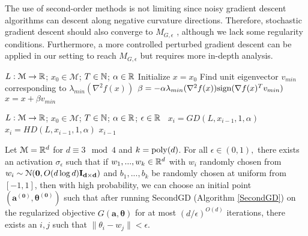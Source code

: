The use of second-order methods is not limiting since noisy gradient descent algorithms can descent along negative curvature directions. Therefore, stochastic gradient descent should also converge to $M_{G,\epsilon}$ \cite{GeHJY15}, although we lack some regularity conditions. Furthermore, a more controlled perturbed gradient descent \cite{jin2017escape} can be applied in our setting to reach $M_{G,\epsilon}$ but requires more in-depth analysis.
%
\begin{algorithm}[hb]
 \caption{$x = HD(L,x_0, T,\alpha$)}
   \label{HD}
\begin{algorithmic}
    $L: \mathcal{M} \to {\mathbb{R}}$; $x_0 \in \mathcal{M}$; $T\in {\mathbb{N}}$; $\alpha \in {\mathbb{R}}$
   \State Initialize $x = x_0$
   \State Find unit eigenvector $v_{min}$ corresponding to $\lambda_{min}(\nabla^2 f(x))$ 
   \State  $\beta = -\alpha \lambda_{min}(\nabla^2 f(x)) \text{sign}(\nabla f(x)^Tv_{min}) $
    \State $x = x + \beta v_{min}$
   \EndFor
\end{algorithmic}
\end{algorithm}
%
\begin{algorithm}[hb]
 \caption{$x = SecondGD(L, x_0, T,\alpha, \eta, \gamma)$}
   \label{SecondGD}
\begin{algorithmic}
    $L:\mathcal{M} \to {\mathbb{R}}$; $x_0 \in
   \mathcal{M}$; $T\in {\mathbb{N}}$; $\alpha \in {\mathbb{R}}$; $\epsilon\in{\mathbb{R}}$
   \  $x_{i} = GD(L, x_{i-1}, 1, \alpha)$
   \Else \
$x_i = HD(L, x_{i-1}, 1, \alpha)$ 
  \EndIf
     \Return $x_{i-1}$
   \EndIf 
   \EndFor
   \end{algorithmic}
\end{algorithm}
%
\begin{theorem}\label{almostHarmSGD}
  Let $\mathcal{M} = {\mathbb{R}}^{d}$ for $d \equiv 3 \mod 4$ and $k = \mathrm{poly}(d)$. For all $\epsilon \in (0,1),$ there exists an activation $\sigma_\epsilon$ such that if $w_1,...,w_k \in {\mathbb{R}}^d$ with $w_i$ randomly chosen from $w_i \sim  \mathcal{N}({\bf 0}, O(d\log d){\bf I_{d\times d}})$ and $b_1,...,b_k$ be randomly chosen at uniform from $[-1,1]$, then with high probability, we can choose an initial point $(\boldsymbol{a^{(0)}, \theta^{(0)}})$ such that after running SecondGD (Algorithm \ref{SecondGD}) on the regularized objective $G(\boldsymbol{a,\theta})$ for at most $(d/\epsilon)^{O(d)}$ iterations, there exists an $i, j$ such that $\|\theta_i - w_j\| <  \epsilon$.
\end{theorem}
